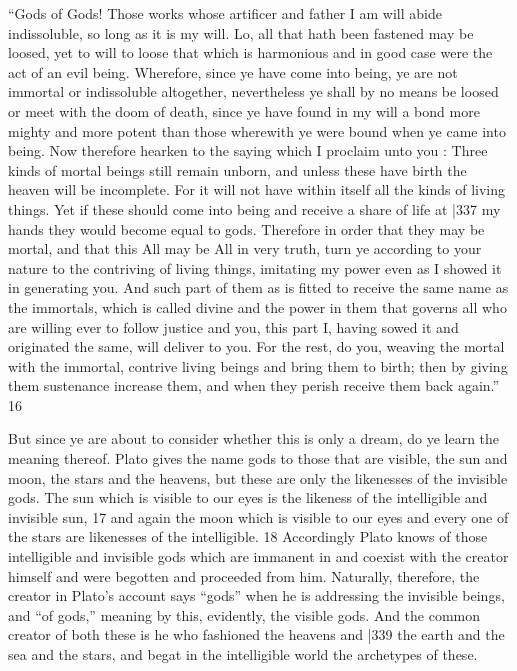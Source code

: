 ``Gods of Gods! Those works whose artificer and father I am will abide indissoluble, so long as it is my will. Lo, all that hath been fastened may be loosed, yet to will to loose that which is harmonious and in good case were the act of an evil being. Wherefore, since ye have come into being, ye are not immortal or indissoluble altogether, nevertheless ye shall by no means be loosed or meet with the doom of death, since ye have found in my will a bond more mighty and more potent than those wherewith ye were bound when ye came into being. Now therefore hearken to the saying which I proclaim unto you : Three kinds of mortal beings still remain unborn, and unless these have birth the heaven will be incomplete. For it will not have within itself all the kinds of living things. Yet if these should come into being and receive a share of life at
|337 my hands they would become equal to gods. Therefore in order that they may be mortal, and that this All may be All in very truth, turn ye according to your nature to the contriving of living things, imitating my power even as I showed it in generating you. And such part of them as is fitted to receive the same name as the immortals, which is called divine and the power in them that governs all who are willing ever to follow justice and you, this part I, having sowed it and originated the same, will deliver to you. For the rest, do you, weaving the mortal with the immortal, contrive living beings and bring them to birth; then by giving them sustenance increase them, and when they perish receive them back again.''
16

But since ye are about to consider whether this is only a dream, do ye learn the meaning thereof. Plato gives the name gods to those that are visible, the sun and moon, the stars and the heavens, but these are only the likenesses of the invisible gods. The sun which is visible to our eyes is the likeness of the intelligible and invisible sun, 17 and again the moon which is visible to our eyes and every one of the stars are likenesses of the intelligible. 18 Accordingly Plato knows of those intelligible and invisible gods which are immanent in and coexist with the creator himself and were begotten and proceeded from him. Naturally, therefore, the creator in Plato's account says ``gods'' when he is addressing the invisible beings, and ``of gods,'' meaning by this, evidently, the visible gods. And the common creator of both these is he who fashioned the heavens and
|339 the earth and the sea and the stars, and begat in the intelligible world the archetypes of these.

